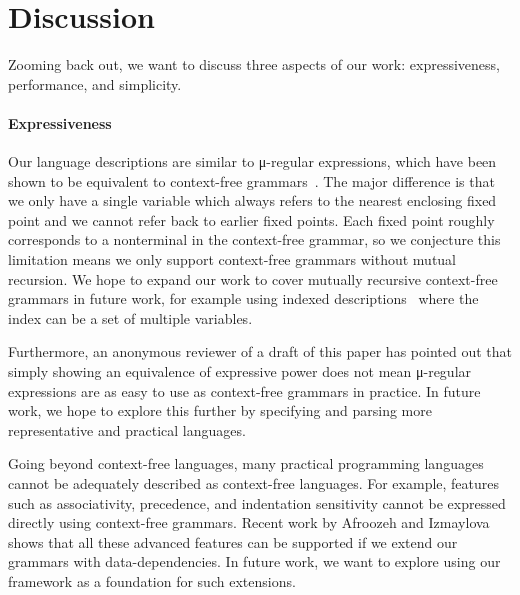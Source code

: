 \begin{code}[hide]%
\>[0]\AgdaSpace{}%
\AgdaSpace{}%
\<%
\end{code}

\section{Discussion}\label{sec:discussion}

Zooming back out, we want to discuss three aspects of our work: expressiveness, performance, and simplicity.

\paragraph{Expressiveness} Our language descriptions are similar to μ-regular
expressions, which have been shown to be equivalent to context-free
grammars~\cite{Thiemann17}. The major difference is that we only have a single
variable which always refers to the nearest enclosing fixed point and we cannot
refer back to earlier fixed points. Each fixed point roughly corresponds to a
nonterminal in the context-free grammar, so we conjecture this limitation means
we only support context-free grammars without mutual recursion. We hope to
expand our work to cover mutually recursive context-free grammars in future
work, for example using indexed descriptions~\cite{10.1145/1932681.1863547}
where the index can be a set of multiple variables.

Furthermore, an anonymous reviewer of a draft of this paper has pointed out that
simply showing an equivalence of expressive power does not mean μ-regular
expressions are as easy to use as context-free grammars in practice. In future
work, we hope to explore this further by specifying and parsing more
representative and practical languages.

Going beyond context-free languages, many practical programming languages cannot
be adequately described as context-free languages. For example, features such as
associativity, precedence, and indentation sensitivity cannot be expressed
directly using context-free grammars. Recent work by Afroozeh and
Izmaylova~\cite{one-parser-to-rule-them-all} shows that all these advanced
features can be supported if we extend our grammars with data-dependencies. In
future work, we want to explore using our framework as a foundation for such
extensions.

